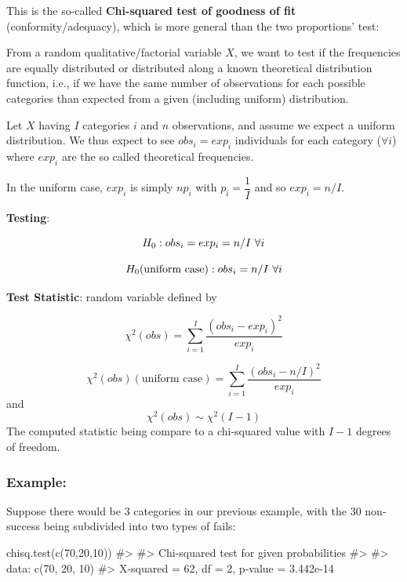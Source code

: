 \documentclass[
  letterpaper,
  DIV=11,
  numbers=noendperiod]{scrreprt}
\newenvironment{Shaded}{\begin{snugshade}}{\end{snugshade}}
\newcommand{\CommentTok}[1]{\textcolor[rgb]{0.37,0.37,0.37}{#1}}
\newcommand{\DecValTok}[1]{\textcolor[rgb]{0.68,0.00,0.00}{#1}}
\newcommand{\FunctionTok}[1]{\textcolor[rgb]{0.28,0.35,0.67}{#1}}
\newcommand{\NormalTok}[1]{\textcolor[rgb]{0.00,0.23,0.31}{#1}}
\begin{document}
This is the so-called \textbf{Chi-squared test of goodness of fit}
(conformity/adequacy), which is more general than the two proportions'
test:

From a random qualitative/factorial variable \(X\), we want to test if
the frequencies are equally distributed or distributed along a known
theoretical distribution function, i.e., if we have the same number of
observations for each possible categories than expected from a given
(including uniform) distribution.

Let \(X\) having \(I\) categories \(i\) and \(n\) observations, and
assume we expect a uniform distribution. We thus expect to see
\(obs_i = exp_i\) individuals for each category (\(\forall i\)) where
\(exp_i\) are the so called theoretical frequencies.

In the uniform case, \(exp_i\) is simply \(n p_i\) with
\(p_i=\dfrac{1}{I}\) and so \(exp_i=n/I\).

\textbf{Testing}:

\[H_0: obs_i = exp_i = n/I$ $\forall i\]

\[H_0 (\text{uniform case}): obs_i = n/I$ $\forall i\]

\textbf{Test Statistic}: random variable defined by

\[\chi^2(obs) = \sum^I_{i=1} \dfrac{(obs_i - exp_i)^2}{exp_i}\]

\[\chi^2(obs) (\text{uniform case})= \sum^I_{i=1} \dfrac{(obs_i - n/I)^2}{exp_i} \]
and \[\chi^2(obs) \sim \chi^2(I-1) \] The computed statistic being
compare to a chi-squared value with \(I-1\) degrees of freedom.

\subsubsection{Example:}\label{example-7}

Suppose there would be 3 categories in our previous example, with the 30
non-success being subdivided into two types of fails:

\begin{Shaded}
\begin{Highlighting}[]
\FunctionTok{chisq.test}\NormalTok{(}\FunctionTok{c}\NormalTok{(}\DecValTok{70}\NormalTok{,}\DecValTok{20}\NormalTok{,}\DecValTok{10}\NormalTok{))}
\CommentTok{\#\textgreater{} }
\CommentTok{\#\textgreater{}  Chi{-}squared test for given probabilities}
\CommentTok{\#\textgreater{} }
\CommentTok{\#\textgreater{} data:  c(70, 20, 10)}
\CommentTok{\#\textgreater{} X{-}squared = 62, df = 2, p{-}value = 3.442e{-}14}
\end{Highlighting}
\end{Shaded}
\end{document}
